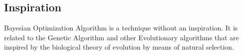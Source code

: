 \subsection{Inspiration}
Bayesian Optimization Algorithm is a technique without an inspiration. It is related to the Genetic Algorithm and other Evolutionary algorithms that are inspired by the biological theory of evolution by means of natural selection.


